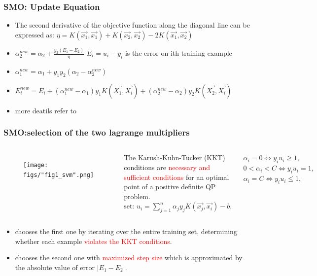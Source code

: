 \documentclass{beamer}
\begin{document}
\begin{frame}
	\frametitle{SMO: Update Equation}	 
	\begin{itemize}
		\item The second derivative of the objective function along the diagonal line can be expressed as:
		$\eta = K(\vec{x_1},\vec{x_1})+K(\vec{x_2},\vec{x_2})-2K(\vec{x_1},\vec{x_2})$ 
		\item $\alpha_{2}^{new} = \alpha_2 + \frac{y_2(E_1-E_2)}{\eta}$  $E_i = u_i-y_i $ is the error on ith training example 
		\item $\alpha_{1}^{new} = \alpha_1 + y_1y_2(\alpha_2-\alpha_{2}^{new})$

		\item $E_{i}^{new} = E_i + (\alpha_{1}^{new}-\alpha_1)y_1K(\vec{X_1},\vec{X_i}) + (\alpha_{2}^{new}-\alpha_2)y_2K(\vec{X_2},\vec{X_i})$	
		\item more deatils refer to \cite{Platt}
		
	\end{itemize}	
	
	
\end{frame}



\begin{frame}
	\frametitle{SMO:selection of the two lagrange multipliers}	 

		\begin{columns}[c] %
			
			\begin{figure}
				\texttt{[image: figs/"fig1\_svm".png]}
				
			\end{figure}
			
			
			The Karush-Kuhn-Tucker (KKT) conditions are \textcolor{red}{necessary and sufficient conditions} for an
			optimal point of a positive definite QP problem. \\
			$ \text{set: } u_i = \sum_{j=1}^{n}\alpha_jy_jK(\vec{x_j},\vec{x_i})-b, $\\ 
			
			$ \alpha_i=0 \Leftrightarrow y_iu_i \geq 1, $ \\
			$ 0 < \alpha_i < C \Leftrightarrow y_iu_i = 1,$\\
			$ \alpha_i=C \Leftrightarrow y_iu_i \leq 1,$
		\end{columns}
			\begin{itemize}
		\item chooses the first one by iterating over the entire training set, determining whether each example \textcolor{red}{violates the KKT
		conditions}.
		\item chooses the second one with \textcolor{red}{maximized step size} which is approximated by the absolute value of error $|E_1-E_2|$.
	\end{itemize}	
\end{frame}
\end{document}

